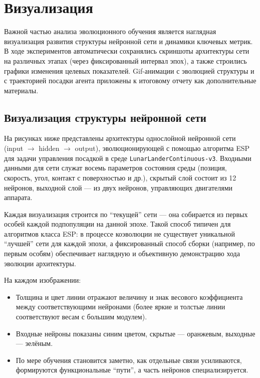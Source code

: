 \documentclass[a4paper,12pt]{article}
\begin{document}
\section{Визуализация}

Важной частью анализа эволюционного обучения является наглядная визуализация развития структуры нейронной сети и динамики ключевых метрик. В ходе экспериментов автоматически сохранялись скриншоты архитектуры сети на различных этапах (через фиксированный интервал эпох), а также строились графики изменения целевых показателей. Gif-анимации с эволюцией структуры и с траекторией посадки агента приложены к итоговому отчету как дополнительные материалы.

\subsection{Визуализация структуры нейронной сети}

На рисунках ниже представлены архитектуры однослойной нейронной сети (input $\rightarrow$ hidden $\rightarrow$ output), эволюционирующей с помощью алгоритма ESP для задачи управления посадкой в среде \texttt{LunarLanderContinuous-v3}. Входными данными для сети служат восемь параметров состояния среды (позиция, скорость, угол, контакт с поверхностью и др.), скрытый слой состоит из 12 нейронов, выходной слой --- из двух нейронов, управляющих двигателями аппарата.

Каждая визуализация строится по ``текущей'' сети --- она собирается из первых особей каждой подпопуляции на данной эпохе. Такой способ типичен для алгоритмов класса ESP: в процессе коэволюции не существует уникальной ``лучшей'' сети для каждой эпохи, а фиксированный способ сборки (например, по первым особям) обеспечивает наглядную и объективную демонстрацию хода эволюции архитектуры.

На каждом изображении:
\begin{itemize}
	\item Толщина и цвет линии отражают величину и знак весового коэффициента между соответствующими нейронами (более яркие и толстые линии соответствуют весам с большим модулем).
	\item Входные нейроны показаны синим цветом, скрытые --- оранжевым, выходные --- зелёным.
	\item По мере обучения становится заметно, как отдельные связи усиливаются, формируются функциональные ``пути'', а часть нейронов специализируется.
\end{itemize}
\end{document}
